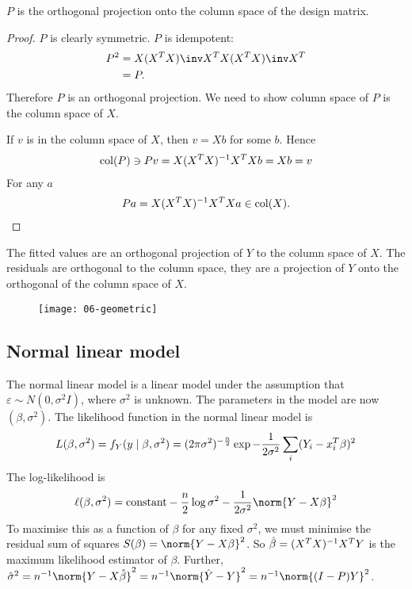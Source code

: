 \begin{proposition}
	$P$ is the orthogonal projection onto the column space of the design matrix.
\end{proposition}

\begin{proof}
	$P$ is clearly symmetric.
	$P$ is idempotent:
	\begin{align*}
		P^2 &= X (X^\tran X)\inv X^\tran X (X^\tran X)\inv X^\tran \\
		&= P.
	\end{align*}
	Therefore $P$ is an orthogonal projection.
	We need to show column space of $P$ is the column space of $X$. 

	If $v$ is in the column space of $X$, then $v = Xb$ for some $b$.
	Hence
	\begin{align*}
		\operatorname{col}(P) \ni Pv = X(X^T X)^{-1} X^T X b = Xb = v
	\end{align*}
	For any $a$ 
	\begin{align*}
		Pa = X(X^T X)^{-1} X^T X a \in \operatorname{col}(X).
	\end{align*} 
\end{proof}

\begin{corollary}
	The fitted values are an orthogonal projection of $Y$ to the column space of $X$.
	The residuals are orthogonal to the column space, they are a projection of $Y$ onto the orthogonal of the column space of $X$. 
\end{corollary}

\begin{figure}[h] 
    \centering 
    \texttt{[image: 06-geometric]} 
\end{figure}

\subsection{Normal linear model}

The normal linear model is a linear model under the assumption that $\varepsilon \sim N(0,\sigma^2 I)$, where $\sigma^2$ is unknown.
The parameters in the model are now $(\beta, \sigma^2)$.
The likelihood function in the normal linear model is
\begin{align*}
	L(\beta, \sigma^2) = f_Y(y\mid \beta,\sigma^2) = (2\pi \sigma^2)^{-\frac{n}{2}} \exp{-\frac{1}{2\sigma^2} \sum_i (Y_i - x_i^T\beta)^2}
\end{align*}
The log-likelihood is
\begin{align*}
	\ell(\beta,\sigma^2) = \text{constant} - \frac{n}{2}\log \sigma^2 - \frac{1}{2\sigma^2} \norm{Y-X\beta}^2
\end{align*}
To maximise this as a function of $\beta$ for any fixed $\sigma^2$, we must minimise the residual sum of squares $S(\beta) = \norm{Y-X\beta}^2$.
So $\hat \beta = (X^T X)^{-1} X^T Y$ is the maximum likelihood estimator of $\beta$.
Further, $\hat \sigma^2 = n^{-1} \norm{Y-X\hat\beta}^2 = n^{-1} \norm{\hat Y - Y}^2 = n^{-1} \norm{(I-P)Y}^2$.

